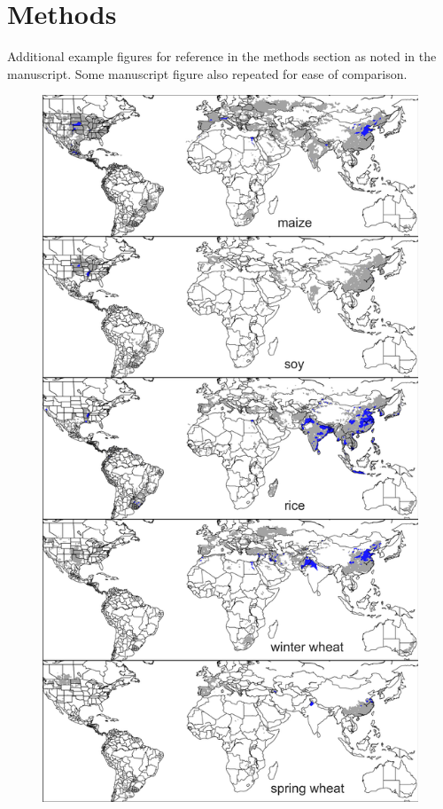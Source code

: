 \documentclass[10pt]{article}
\begin{document}
\tableofcontents

\clearpage
\modulolinenumbers[2]
\linenumbers

\renewcommand{\thefigure}{S\arabic{figure}}

\section{Methods}
Additional example figures for reference in the methods section as noted in the manuscript. Some manuscript figure also repeated for ease of comparison.

\begin{figure}[h!]
\centering
\begin{minipage}{.45\textwidth}
    \centering
    \vspace{0pt}
    \includegraphics[width=\textwidth]{s_croparea_irr.png}\\

\end{minipage}
\end{figure}
\end{document}
